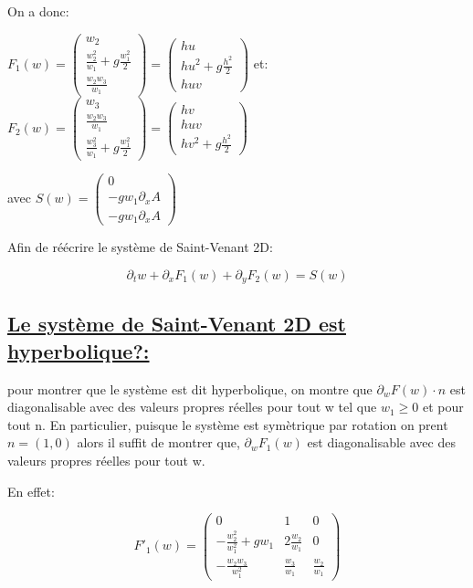 On a donc:

$F_1(w) = \begin{pmatrix}
w_2\\
\frac{w_2^2}{w_1} + g \frac{w_1^2}{2}\\
\frac{w_2 w_3} {w_1}
\end{pmatrix}=
\begin{pmatrix}
hu\\
h u^2 + g \frac{h^2}{2}\\
huv
\end{pmatrix}$
et:
$F_2(w) = \begin{pmatrix}
w_3\\
\frac{w_2 w_3} {w_1}\\
\frac{w_3^2}{w_1} + g \frac{w_1^2}{2}
\end{pmatrix}=
\begin{pmatrix}
hv\\
huv\\
h v^2 + g \frac{h^2}{2}
\end{pmatrix}$

avec
$S(w) = \begin{pmatrix}
0\\
-gw_1\partial_xA\\
-gw_1\partial_xA 
\end{pmatrix}$

Afin de r\'e\'ecrire le syst\`eme de Saint-Venant 2D:

$$\partial_t w +  \partial_x F_1(w) + \partial_y F_2(w) = S(w)$$


\subsection[Le syst\`eme de Saint-Venant 2D est hyperbolique?]{\uline{Le syst\`eme de Saint-Venant 2D est hyperbolique?:}}

pour montrer que le système est dit hyperbolique, on montre que $\partial_w F(w) · n$ est diagonalisable avec des valeurs propres r\'eelles pour tout w tel que $w_1 ≥ 0$ et pour tout n. En particulier, puisque le syst\`eme est sym\`etrique par rotation on prent $n = (1,0)$ alors il suffit de montrer que,
$\partial_w F_1(w)$ est diagonalisable avec des valeurs propres r\'eelles pour tout w.

En effet:

$$F'_1(w) = \begin{pmatrix}
0 & 1& 0\\
-\frac{w_2^2}{w_1^2} + g w_1 & 2 \frac{w_2}{w_1} & 0\\
-\frac{w_2 w_3} {w_1^2} & \frac{w_3} {w_1} & \frac{w_2} {w_1}
\end{pmatrix}$$

